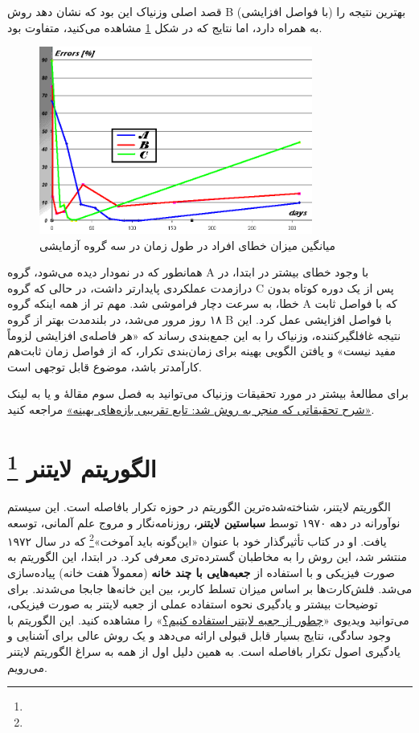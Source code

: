 \documentclass[12pt]{report}
\begin{document}
قصد اصلی وزنیاک این بود که نشان دهد روش B (با فواصل افزایشی) بهترین نتیجه را به همراه دارد، اما نتایج که در شکل \ref{fig:three-group-repetition.png} مشاهده می‌کنید، متفاوت بود.

\begin{figure}[h!]
\centering
\includegraphics[width=0.8\textwidth]{images/three-group-repetition.png}
\caption{میانگین میزان خطای افراد در طول زمان در سه گروه آزمایشی}
\label{fig:three-group-repetition.png}
\end{figure}

همانطور که در نمودار دیده می‌شود، گروه A با وجود خطای بیشتر در ابتدا، در درازمدت عملکردی پایدارتر داشت، در حالی که گروه C پس از یک دوره کوتاه بدون خطا، به سرعت دچار فراموشی شد.
مهم تر از همه اینکه گروه A که با فواصل ثابت ۱۸ روز مرور می‌شد، در بلندمدت بهتر از گروه B با فواصل افزایشی عمل کرد.
این نتیجه غافلگیرکننده، وزنیاک را به این جمع‌بندی رساند که «هر فاصله‌ی افزایشی لزوماً مفید نیست» و یافتن الگویی بهینه برای زمان‌بندی تکرار،
که از فواصل زمان  ثابت‌هم کارآمدتر باشد، موضوع قابل توجهی است. 

برای مطالعهٔ بیشتر در مورد تحقیقات وزنیاک می‌توانید به فصل سوم مقالهٔ \cite{ol} و یا به لینک
\href{https://super-memory.com/english/ol/beginning.htm}{«شرح تحقیقاتی که منجر به روش  شد: تابع تقریبی بازه‌های بهینه»}
مراجعه کنید.

\chapter{الگوریتم لایتنر
\protect\footnote{}
}

الگوریتم لایتنر، شناخته‌شده‌ترین الگوریتم در حوزه تکرار بافاصله است. این سیستم نوآورانه در دهه ۱۹۷۰ توسط \textbf{سباستین لایتنر}، روزنامه‌نگار و مروج علم آلمانی، توسعه یافت. او در کتاب تأثیرگذار خود با عنوان «این‌گونه باید آموخت»\footnote{} که در سال ۱۹۷۲ منتشر شد، این روش را به مخاطبان گسترده‌تری معرفی کرد.
در ابتدا، این الگوریتم به صورت فیزیکی و با استفاده از \textbf{جعبه‌هایی با چند خانه} (معمولاً هفت خانه) پیاده‌سازی می‌شد. فلش‌کارت‌ها بر اساس میزان تسلط کاربر، بین این خانه‌ها جابجا می‌شدند. برای توضیحات بیشتر و یادگیری نحوه استفاده عملی از جعبه لایتنر به صورت فیزیکی، می‌توانید ویدیوی «\href{https://www.youtube.com/watch?v=JMoFwgdourI}{چطور از جعبه لایتنر استفاده کنیم؟}» را مشاهده کنید.
این الگوریتم با وجود سادگی، نتایج بسیار قابل قبولی ارائه می‌دهد و یک روش عالی برای آشنایی و یادگیری اصول تکرار بافاصله است.
به همین دلیل اول از همه به سراغ الگوریتم لایتنر می‌رویم.
\end{document}
